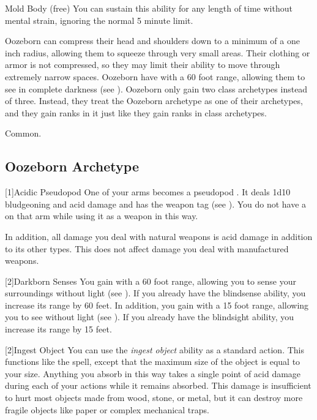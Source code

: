 \begin{itemize}
\begin{sustainability}{Mold Body}{ (free)}
        You can sustain this ability for any length of time without mental strain, ignoring the normal 5 minute limit.
      \end{sustainability}
     Oozeborn can compress their head and shoulders down to a minimum of a one inch radius, allowing them to squeeze through very small areas.
      Their clothing or armor is not compressed, so they may limit their ability to move through extremely narrow spaces.
     Oozeborn have  with a 60 foot range, allowing them to see in complete darkness (see ).
     Oozeborn only gain two class archetypes instead of three.
      Instead, they treat the Oozeborn archetype as one of their archetypes, and they gain ranks in it just like they gain ranks in class archetypes.
  \end{itemize}
   Common.

  \subsection{Oozeborn Archetype}

    [1]{Acidic Pseudopod} One of your arms becomes a pseudopod .
      It deals 1d10 bludgeoning and acid damage and has the  weapon tag (see ).
      You do not have a  on that arm while using it as a weapon in this way.

      In addition, all damage you deal with natural weapons is acid damage in addition to its other types.
      This does not affect damage you deal with manufactured weapons.

    [2]{Darkborn Senses} You gain  with a 60 foot range, allowing you to sense your surroundings without light (see ).
      If you already have the blindsense ability, you increase its range by 60 feet.
      In addition, you gain  with a 15 foot range, allowing you to see without light (see ).
      If you already have the blindsight ability, you increase its range by 15 feet.

    [2]{Ingest Object} You can use the \textit{ingest object} ability as a standard action.
      This functions like the  spell, except that the maximum size of the object is equal to your size.
      Anything you absorb in this way takes a single point of  acid damage during each of your actions while it remains absorbed.
      This damage is insufficient to hurt most objects made from wood, stone, or metal, but it can destroy more fragile objects like paper or complex mechanical traps.

